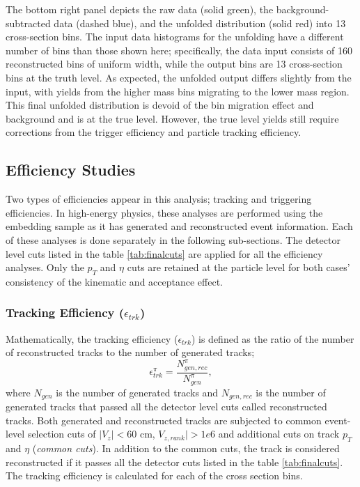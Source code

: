 The bottom right panel depicts the raw data (solid green), the background-subtracted data (dashed blue), and the unfolded distribution (solid red) into 13 cross-section bins. The input data histograms for the unfolding have a different number of bins than those shown here; specifically, the data input consists of 160 reconstructed bins of uniform width, while the output bins are 13 cross-section bins at the truth level. As expected, the unfolded output differs slightly from the input, with yields from the higher mass bins migrating to the lower mass region. This final unfolded distribution is devoid of the bin migration effect and background and is at the true level. However, the true level yields still require corrections from the trigger efficiency and particle tracking efficiency. 

 \subsection{Efficiency Studies}
Two types of efficiencies appear in this analysis; tracking and triggering efficiencies. In high-energy physics, these analyses are performed using the embedding sample as it has generated and reconstructed event information. Each of these analyses is done separately in the following sub-sections. The detector level cuts listed in the table \ref{tab:finalcuts} are applied for all the efficiency analyses. Only the $p_T$ and $\eta$ cuts are retained at the particle level for both cases' consistency of the kinematic and acceptance effect. 

 \subsubsection{Tracking Efficiency ($\epsilon_{trk}$)}
 \label{subsec:trkeff}

Mathematically, the tracking efficiency ($\epsilon_{trk}$) is defined as the ratio of the number of reconstructed tracks to the number of generated tracks;
\begin{equation}
\epsilon_{trk}^\pi = \frac{N_{gen, rec}^{\pi}}{N_{gen}^{\pi}},
\label{eq:trkeff}
\end{equation}
where $N_{gen}$ is the number of generated tracks and $N_{gen, rec}$ is the number of generated tracks that passed all the detector level cuts called reconstructed tracks. Both generated and reconstructed tracks are subjected to common event-level selection cuts of $|V_z|<60$ cm, $V_{z,rank}|>1e6$ and additional cuts on track $p_T$ and $\eta$ (\emph{common cuts}). In addition to the common cuts, the track is considered reconstructed if it passes all the detector cuts listed in the table \ref{tab:finalcuts}.
The tracking efficiency is calculated for each of the cross section bins.

